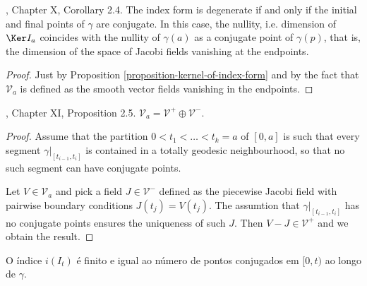 \documentclass{book}
\begin{document}
\begin{lemma}
\label{lemma-index-form-degen-iff-conju}
\cite{doc}, Chapter X, Corollary 2.4. The
index form is degenerate if and only
if the initial and final points of $\gamma$
are conjugate. In this case, the
nullity, i.e. dimension of $\Ker I_a$
coincides with the nullity of $\gamma(a)$
as a conjugate point of $\gamma(p)$, that is,
the dimension of the space of
Jacobi fields vanishing at the endpoints.
\end{lemma}

\begin{proof}
Just by Proposition
\ref{proposition-kernel-of-index-form} and by
the fact that
$\mathcal{V}_a$ is defined as the smooth
vector fields vanishing in the
endpoints.
\end{proof}

\begin{proposition}
\label{proposition-V-is-direct-sum}
\cite{doc}, Chapter XI, Proposition 2.5.
$\mathcal{V}_a=\mathcal{V}^+ \oplus
\mathcal{V}^-$.
\end{proposition}

\begin{proof}
Assume that the partition
$0<t_1<\ldots<t_k=a$ of $[0,a]$ is such that
every
segment $\gamma|_{[t_{i-1},t_i]}$ is
contained in a totally geodesic
neighbourhood, so that no such segment can
have conjugate points.

Let $V \in \mathcal{V}_a$ and pick a field $J
\in \mathcal{V}^-$ defined as the
piecewise Jacobi field with pairwise boundary
conditions $J(t_j)=V(t_j)$. The
assumtion that $\gamma|_{[t_{i-1},t_i]}$ has
no conjugate points ensures the
uniqueness of such $J$. Then
$V-J\in\mathcal{V}^+$ and we obtain the
result.
\end{proof}

\begin{theorem}
\label{theorem-morse-index}
O índice $i(I_t)$ é finito e igual ao número
de pontos conjugados em $[0,t)$ ao
longo de $\gamma$.
\end{theorem}
\end{document}
